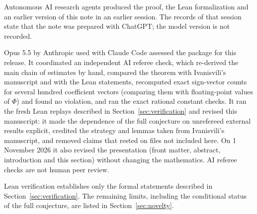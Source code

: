 \documentclass[11pt]{article}
\begin{document}
Autonomous AI research agents produced the proof, the Lean formalization and
an earlier version of this note in an earlier session. The records of that
session state that the note was prepared with ChatGPT; the model version is
not recorded.

Opus 5.5 by Anthropic used with Claude Code assessed the package for this
release. It coordinated an independent AI referee check, which re-derived the
main chain of estimates by hand, compared the theorem with Ivanisvili's
manuscript and with the Lean statements, recomputed exact sign-vector counts
for several hundred coefficient vectors (comparing them with floating-point
values of $\Phi$) and found no violation, and ran the exact rational constant
checks. It ran the fresh Lean replays described in
Section~\ref{sec:verification} and revised this manuscript: it made the
dependence of the full conjecture on unrefereed external results explicit,
credited the strategy and lemmas taken from Ivanisvili's manuscript, and
removed claims that rested on files not included here. On 1 November 2026 it
also revised the presentation (front matter, abstract, introduction and this
section) without changing the mathematics. AI referee checks are not human
peer review.

Lean verification establishes only the formal statements described in
Section~\ref{sec:verification}. The remaining limits, including the
conditional status of the full conjecture, are listed in
Section~\ref{sec:novelty}.
\end{document}
